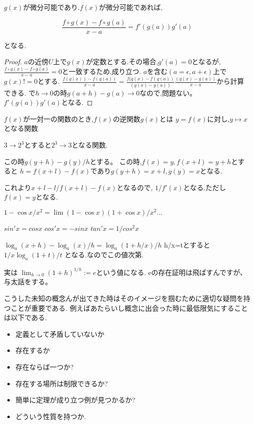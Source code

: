 \begin{thm}[合成関数の微分]
  $g(x)$が微分可能であり.$f(x)$が微分可能であれば,

  \begin{equation*}
    \frac{f\circ g (x) - f\circ g (a)}{x-a} = f'(g(a))g'(a)
  \end{equation*}

となる.
\end{thm}

\begin{proof}
$a$の近傍$U$上で$g(x)$が定数とする.その場合,$g'(a) =0$となるが,
$\frac{f\circ g (x) - f\circ g (a)}{x-a} = 0$と一致するため,成り立つ.
$a$を含む$(a = \epsilon, a + \epsilon)$上で$g(x) != 0$とする.
$\frac{f(g(x)) - f(g(a))}{x- a} = \frac{f(g(x)-f(g(a))}{(g(x)-g(a))} \frac{(g(x)-g(a))}{x-a}$から計算できる.
で$h \to 0$の時$g(a+h) - g(a) \to 0$なので,問題ない。
$f'(g(a)) g'(a)$となる.
\end{proof}


\begin{dfn}
$f(x)$が一対一の関数のとき,$f(x)$の逆関数$g(x)$とは
$y = f(x)$に対し,$y \mapsto x$となる関数
\end{dfn}


\begin{epl}[指数関数と対数関数]
$3 \to 2^3$とすると$2^3 \to 3$となる関数.

この時$g(y+h) - g(y)/h$とする。
この時,$f(x) = y,f(x+l) = y+h$とすると
$h = f(x+l) - f(x)$であり$g(y+h) = x +l,g(y) = x$となる.

これより$x+l - l /f(x+l) - f(x)$となるので,
$1/f'(x)$となる.ただし$f(x) = y$となる.
\end{epl}


\begin{prop}[三角関数の微分]
$1-\cos x/x^2 = \lim (1 - \cos x)(1 + \cos x)/x^2 ...$

$sin'x =cosx$
$cos'x = - sinx$
$tan'x = 1/ cos^2x$
\end{prop}


\begin{prop}[対数関数の微分]
$\log_a(x+h) - \log_a(x)/h = \log_a(1+h/x)/h$
h/x=tとすると $ 1/x \log_a(1+t)/t$
となる.なのでこの値次第.
\end{prop}


実は
$\lim_{h \to 0} (1 +h)^{1/h}:=e$という値になる.
eの存在証明は飛ばすんですが、与太話をする。

\begin{rem}
こうした未知の概念んが出てきた時はそのイメージを掴むために適切な疑問を持つことが重要である.
例えばあたらいし概念に出会った時に最低限気にすることは以下である.
\begin{itemize}
  \item 定義として矛盾していないか
  \item 存在するか
  \item 存在ならば一つか?
  \item 存在する場所は制限できるか?
  \item 簡単に定理が成り立つ例が見つかるか?
  \item どういう性質を持つか.
\end{itemize}
\end{rem}


